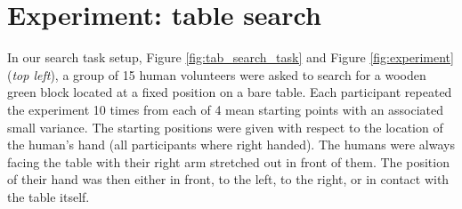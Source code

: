 
\section{Experiment: table search}\label{ch3:experiment}

In our search task setup, Figure \ref{fig:tab_search_task} and  Figure \ref{fig:experiment} (\textit{top left}), 
a group of 15 human volunteers were asked to search for a wooden green block located at a fixed position on a bare table. 
Each participant repeated the experiment 10 times from each of 4 mean starting points with an associated small variance. 
The starting positions were given with respect to the location of the human's hand (all participants where right handed). The humans were always facing the table with their right 
arm stretched out in front of them. The  position of their hand was then either in front, to the left, to the right, or in contact with the table itself. 

